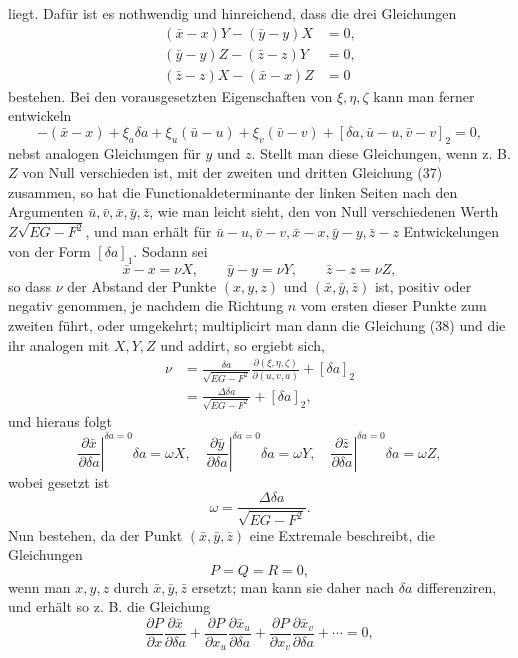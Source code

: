 \documentclass[11pt,a4paper,leqno]{article}
\begin{document}
liegt. Dafür ist es nothwendig und hinreichend, dass die drei Gleichungen
\begin{equation}\tag{37}
\begin{aligned}
(\bar x-x)Y-(\bar y-y)X&=0,\\
(\bar y-y)Z-(\bar z-z)Y&=0,\\
(\bar z-z)X-(\bar x-x)Z&=0
\end{aligned}
\end{equation}
bestehen. Bei den vorausgesetzten Eigenschaften von $\xi,\eta,\zeta$ kann
man ferner entwickeln
\begin{equation}\tag{38}
-(\bar x-x)+\xi_a\delta a+\xi_u(\bar u-u)+\xi_v(\bar v-v)
+[\delta a,\bar u-u,\bar v-v]_2=0,
\end{equation}
nebst analogen Gleichungen für $y$ und $z$. Stellt man diese Gleichungen,
wenn z. B. $Z$ von Null verschieden ist, mit der zweiten und dritten Gleichung
(37) zusammen, so hat die Functionaldeterminante der linken Seiten nach den
Argumenten $\bar u,\bar v,\bar x,\bar y,\bar z$, wie man leicht sieht, den von
Null verschiedenen Werth $Z\sqrt{EG-F^2}$, und man erhält für
$\bar u-u,\bar v-v,\bar x-x,\bar y-y,\bar z-z$ Entwickelungen von der Form
$[\delta a]_1$. Sodann sei
\[
\bar x-x=\nu X,\qquad \bar y-y=\nu Y,\qquad \bar z-z=\nu Z,
\]
so dass $\nu$ der Abstand der Punkte $(x,y,z)$ und $(\bar x,\bar y,\bar z)$
ist, positiv oder negativ genommen, je nachdem die Richtung $n$ vom ersten
dieser Punkte zum zweiten führt, oder umgekehrt; multiplicirt man dann die
Gleichung (38) und die ihr analogen mit $X,Y,Z$ und addirt, so ergiebt sich,
\[
\begin{aligned}
\nu
&=\frac{\delta a}{\sqrt{EG-F^2}}
\frac{\partial(\xi,\eta,\zeta)}{\partial(u,v,a)}+[\delta a]_2\\
&=\frac{\Delta\delta a}{\sqrt{EG-F^2}}+[\delta a]_2,
\end{aligned}
\]
und hieraus folgt
\begin{equation}\tag{39}
\left.\frac{\partial\bar x}{\partial\delta a}\right|^{\delta a=0}
\delta a=\omega X,\quad
\left.\frac{\partial\bar y}{\partial\delta a}\right|^{\delta a=0}
\delta a=\omega Y,\quad
\left.\frac{\partial\bar z}{\partial\delta a}\right|^{\delta a=0}
\delta a=\omega Z,
\end{equation}
wobei gesetzt ist
\begin{equation}\tag{40}
\omega=\frac{\Delta\delta a}{\sqrt{EG-F^2}}.
\end{equation}
Nun bestehen, da der Punkt $(\bar x,\bar y,\bar z)$ eine Extremale beschreibt,
die Gleichungen
\[
P=Q=R=0,
\]
wenn man $x,y,z$ durch $\bar x,\bar y,\bar z$ ersetzt; man kann sie daher nach
$\delta a$ differenziren, und erhält so z. B. die Gleichung
\begin{equation}\tag{41}
\frac{\partial P}{\partial x}\frac{\partial\bar x}{\partial\delta a}
+\frac{\partial P}{\partial x_u}\frac{\partial\bar x_u}{\partial\delta a}
+\frac{\partial P}{\partial x_v}\frac{\partial\bar x_v}{\partial\delta a}
+\cdots=0,
\end{equation}
\end{document}

